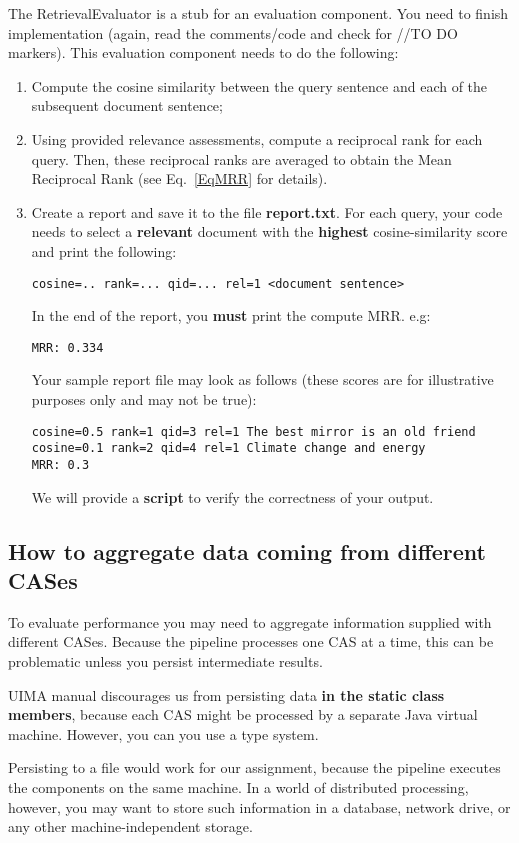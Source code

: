 \documentclass[oneside,11pt]{memoir}
\begin{document}
The RetrievalEvaluator is a stub for an evaluation component. You need to finish implementation
(again, read the comments/code and check for //TO DO markers).
This evaluation component needs to do the following:
\begin{enumerate}
\item Compute the cosine similarity between the query sentence and each of the subsequent
document sentence; 
\item Using provided relevance assessments, compute a reciprocal rank for each query.
Then, these reciprocal ranks are averaged to obtain the Mean Reciprocal Rank (see Eq.~\ref{EqMRR} for details).
\item Create a report and save it to the file \textbf{report.txt}. 
For each query, your code needs to select a \textbf{relevant} document with the
\textbf{highest} cosine-similarity score and print the following:
\begin{verbatim}
cosine=.. rank=... qid=... rel=1 <document sentence>
\end{verbatim}
In the end of the report, you \textbf{must} print the compute MRR. e.g:
\begin{verbatim}
MRR: 0.334
\end{verbatim}
Your sample report file may look as follows (these scores are for illustrative purposes only 
and may not be true):
\begin{verbatim}
cosine=0.5 rank=1 qid=3 rel=1 The best mirror is an old friend
cosine=0.1 rank=2 qid=4 rel=1 Climate change and energy
MRR: 0.3
\end{verbatim}
We will provide a \textbf{script} to verify the correctness of your output.
\end{enumerate}

\subsection{How to aggregate data coming from different CASes} 
To evaluate performance you may need to aggregate information
supplied with different CASes.
Because the pipeline processes one CAS at a time,
this can be problematic unless you persist intermediate results.

UIMA manual discourages us from persisting data \textbf{in the static class members},
because each CAS might be processed by a separate Java virtual machine.
However, you can you use a type system.

Persisting to a file would work for our assignment, because the pipeline executes
the components on the same machine.
In a world of distributed processing, however, you may want to store such information in a database,
network drive, or any other machine-independent storage.
\end{document}
